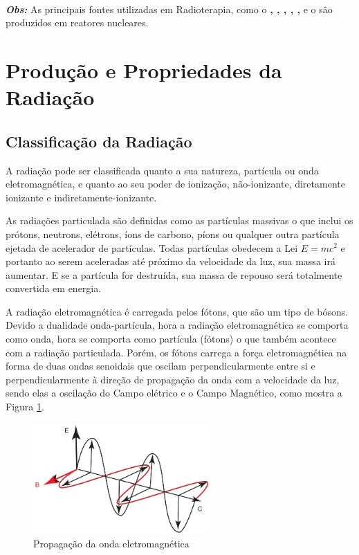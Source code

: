 \documentclass[11pt,a4paper]{article}
\begin{document}
                \

                \noindent \textbf{\textit{\textcolor{CarnationPink}{Obs:}}} As principais fontes utilizadas em Radioterapia, como o \textbf{, , , , , } e o \textbf{} são produzidos em reatores nucleares.  
    
    \section{Produção e Propriedades da Radiação}
        
        \subsection{Classificação da Radiação}

            A radiação pode ser classificada quanto a sua natureza, partícula ou onda eletromagnética, e quanto ao seu poder de ionização, não-ionizante, diretamente ionizante e indiretamente-ionizante.

            As radiações particulada são definidas como as partículas massivas o que inclui os prótons, neutrons, elétrons, íons de carbono, píons ou qualquer outra partícula ejetada de acelerador de partículas. Todas partículas obedecem a Lei $E = mc^2$ e portanto ao serem aceleradas até próximo da velocidade da luz, sua massa irá aumentar. E se a partícula for destruída, sua massa de repouso será totalmente convertida em energia.

            A radiação eletromagnética é carregada pelos fótons, que são um tipo de bósons. Devido a dualidade onda-partícula, hora a radiação eletromagnética se comporta como onda, hora se comporta como partícula (fótons) o que também acontece com a radiação particulada. Porém, os fótons carrega a força eletromagnética na forma de duas ondas senoidais que oscilam perpendicularmente entre si e perpendicularmente à direção de propagação da onda com a velocidade da luz, sendo elas a oscilação do Campo elétrico e o Campo Magnético, como mostra a Figura \ref{fig:ondaEletromagnetica}.

                    \begin{figure}[h]
                        \centering
                        \includegraphics[width=0.6\textwidth]{Imagens/ondaEletromagnetica.jpg}
                        \caption{Propagação da onda eletromagnética}
                        \label{fig:ondaEletromagnetica}
                    \end{figure}
            
\end{document}
